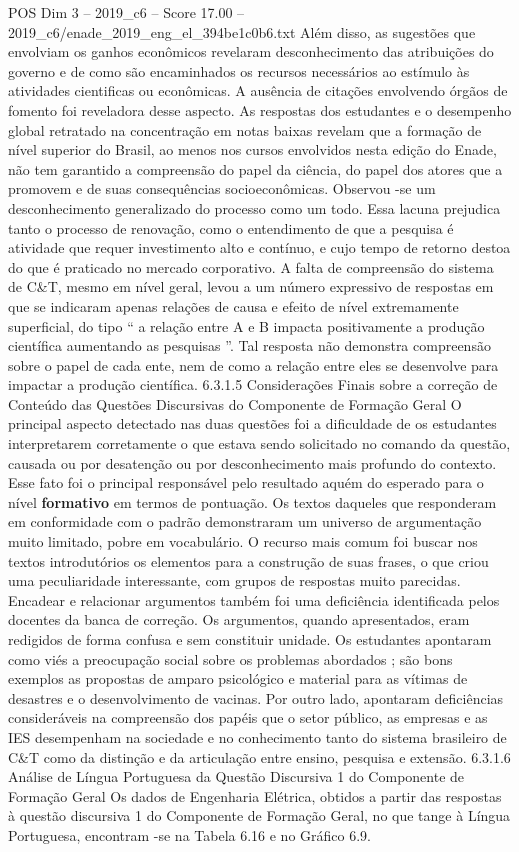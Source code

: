 \begin{textsample}{POS Dim 3 – 2019\_c6 – Score 17.00 – 2019\_c6/enade\_2019\_eng\_el\_394be1c0b6.txt}
Além disso, as sugestões que envolviam os ganhos econômicos revelaram desconhecimento das atribuições do governo e de como são encaminhados os recursos necessários ao estímulo às atividades cientificas ou econômicas.
A ausência de citações envolvendo órgãos de fomento foi reveladora desse aspecto.
As respostas dos estudantes e o desempenho global retratado na concentração em notas baixas revelam que a formação de nível superior do Brasil, ao menos nos cursos envolvidos nesta edição do Enade, não tem garantido a compreensão do papel da ciência, do papel dos atores que a promovem e de suas consequências socioeconômicas.
Observou -se um desconhecimento generalizado do processo como um todo.
Essa lacuna prejudica tanto o processo de renovação, como o entendimento de que a pesquisa é atividade que requer investimento alto e contínuo, e cujo tempo de retorno destoa do que é praticado no mercado corporativo.
A falta de compreensão do sistema de C\&T, mesmo em nível geral, levou a um número expressivo de respostas em que se indicaram apenas relações de causa e efeito de nível extremamente superficial, do tipo “ a relação entre A e B impacta positivamente a produção científica aumentando as pesquisas ”.
Tal resposta não demonstra compreensão sobre o papel de cada ente, nem de como a relação entre eles se desenvolve para impactar a produção científica. 6.3.1.5 Considerações Finais sobre a correção de Conteúdo das Questões Discursivas do Componente de Formação Geral O principal aspecto detectado nas duas questões foi a dificuldade de os estudantes interpretarem corretamente o que estava sendo solicitado no comando da questão, causada ou por desatenção ou por desconhecimento mais profundo do contexto.
Esse fato foi o principal responsável pelo resultado aquém do esperado para o nível \textbf{formativo} em termos de pontuação.
Os textos daqueles que responderam em conformidade com o padrão demonstraram um universo de argumentação muito limitado, pobre em vocabulário.
O recurso mais comum foi buscar nos textos introdutórios os elementos para a construção de suas frases, o que criou uma peculiaridade interessante, com grupos de respostas muito parecidas.
Encadear e relacionar argumentos também foi uma deficiência identificada pelos docentes da banca de correção.
Os argumentos, quando apresentados, eram redigidos de forma confusa e sem constituir unidade.
Os estudantes apontaram como viés a preocupação social sobre os problemas abordados ; são bons exemplos as propostas de amparo psicológico e material para as vítimas de desastres e o desenvolvimento de vacinas.
Por outro lado, apontaram deficiências consideráveis na compreensão dos papéis que o setor público, as empresas e as IES desempenham na sociedade e no conhecimento tanto do sistema brasileiro de C\&T como da distinção e da articulação entre ensino, pesquisa e extensão. 6.3.1.6 Análise de Língua Portuguesa da Questão Discursiva 1 do Componente de Formação Geral Os dados de Engenharia Elétrica, obtidos a partir das respostas à questão discursiva 1 do Componente de Formação Geral, no que tange à Língua Portuguesa, encontram -se na Tabela 6.16 e no Gráfico 6.9.

\end{textsample}
